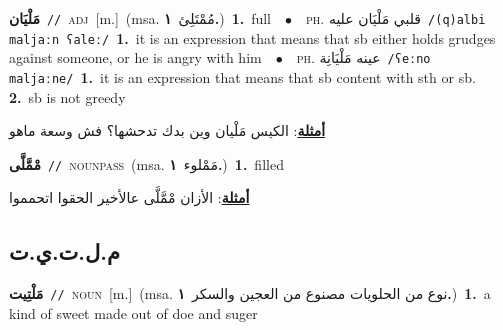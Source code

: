 \documentclass[10pt,a4paper,twoside]{article} %
\begin{document}
\begin{multicols}{2}
{\setlength\topsep{0pt}\textbf{\foreignlanguage{arabic}{مَلْيَان}}\ {\color{gray}\texttt{//}\color{black}}\ \textsc{adj}\ [m.]\ \color{gray}(msa. \foreignlanguage{arabic}{مُمْتَلِئ}~\foreignlanguage{arabic}{\textbf{١.}})\color{black}\ \textbf{1.}~full\ \ $\bullet$\ \ \textsc{ph.} \color{gray} \foreignlanguage{arabic}{قلبي مَلْيَان عليه}\color{black}\ {\color{gray}\texttt{/{\sffamily (q)albi maljaːn ʕaleː}/}\color{black}}\ \textbf{1.}~it is an expression that means that sb either holds grudges against someone, or he is angry with him\ \ $\bullet$\ \ \textsc{ph.} \color{gray} \foreignlanguage{arabic}{عينه مَلْيَانِة}\color{black}\ {\color{gray}\texttt{/{\sffamily ʕeːno maljaːne}/}\color{black}}\ \textbf{1.}~it is an expression that means that sb content with sth or sb.  \textbf{2.}~sb is not greedy\  \begin{flushright}\color{gray}\foreignlanguage{arabic}{\textbf{\underline{\foreignlanguage{arabic}{أمثلة}}}: الكيس مَلْيان وين بدك تدحشها؟ فش وسعة ماهو}\end{flushright}\color{black}} \vspace{2mm}

{\setlength\topsep{0pt}\textbf{\foreignlanguage{arabic}{مْمَّلَّى}}\ {\color{gray}\texttt{//}\color{black}}\ \textsc{noun\textunderscore pass}\ \color{gray}(msa. \foreignlanguage{arabic}{مَمْلوء}~\foreignlanguage{arabic}{\textbf{١.}})\color{black}\ \textbf{1.}~filled\  \begin{flushright}\color{gray}\foreignlanguage{arabic}{\textbf{\underline{\foreignlanguage{arabic}{أمثلة}}}: الأزان مْمَّلَّى عالأخير الحقوا اتحمموا}\end{flushright}\color{black}} \vspace{2mm}

\vspace{-3mm}
\subsection*{\color{blue}\foreignlanguage{arabic}{م.ل.ت.ي.ت}\color{blue}{ (ntws)}} 

{\setlength\topsep{0pt}\textbf{\foreignlanguage{arabic}{مَلْتِيت}}\ {\color{gray}\texttt{//}\color{black}}\ \textsc{noun}\ [m.]\ \color{gray}(msa. \foreignlanguage{arabic}{نوع من الحلويات مصنوع من العجين والسكر}~\foreignlanguage{arabic}{\textbf{١.}})\color{black}\ \textbf{1.}~a kind of sweet made out of doe and suger\ } \vspace{2mm}


\end{multicols}
\end{document}
